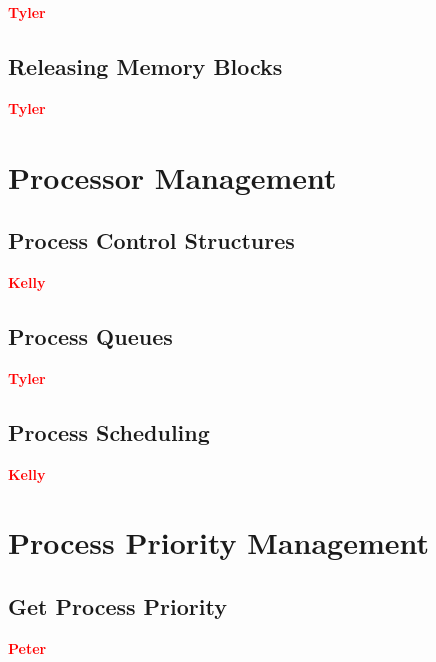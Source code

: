 \documentclass[12pt]{report}
\begin{document}
\textcolor{red}{\textbf{Tyler}} \\

\subsection{Releasing Memory Blocks}

\textcolor{red}{\textbf{Tyler}} \\






\section{Processor Management}

\subsection{Process Control Structures}

\textcolor{red}{\textbf{Kelly}} \\

\subsection{Process Queues}

\textcolor{red}{\textbf{Tyler}} \\


\subsection{Process Scheduling}


\textcolor{red}{\textbf{Kelly}} \\



\section{Process Priority Management}

\subsection{Get Process Priority}

\textcolor{red}{\textbf{Peter}} \\
\end{document}
